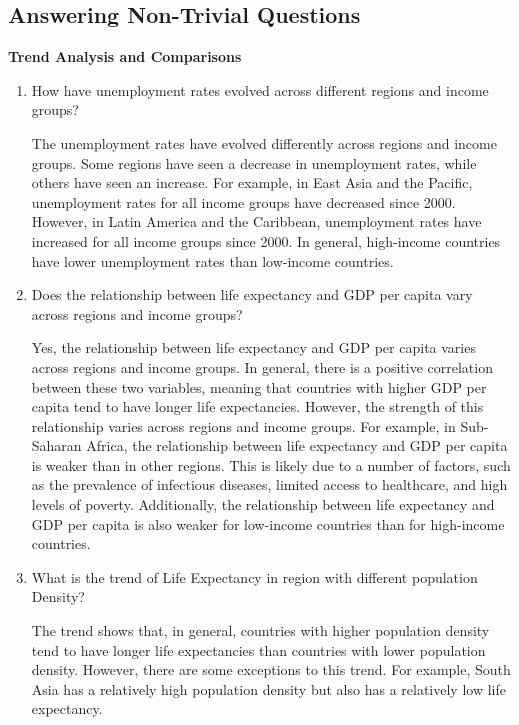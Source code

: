 \documentclass{article}\usepackage[]{graphicx}\usepackage[]{xcolor}
\begin{document}
\subsection{Answering Non-Trivial Questions}
\textbf{Trend Analysis and Comparisons}

\begin{enumerate}
    \item How have unemployment rates evolved across different regions and income groups?

    The unemployment rates have evolved differently across regions and income groups. Some regions have seen a decrease in unemployment rates, while others have seen an increase. For example, in East Asia and the Pacific, unemployment rates for all income groups have decreased since 2000. However, in Latin America and the Caribbean, unemployment rates have increased for all income groups since 2000. In general, high-income countries have lower unemployment rates than low-income countries.
    
    \item Does the relationship between life expectancy and GDP per capita vary across regions and income groups?
    
    Yes, the relationship between life expectancy and GDP per capita varies across regions and income groups. In general, there is a positive correlation between these two variables, meaning that countries with higher GDP per capita tend to have longer life expectancies. However, the strength of this relationship varies across regions and income groups. For example, in Sub-Saharan Africa, the relationship between life expectancy and GDP per capita is weaker than in other regions. This is likely due to a number of factors, such as the prevalence of infectious diseases, limited access to healthcare, and high levels of poverty. Additionally, the relationship between life expectancy and GDP per capita is also weaker for low-income countries than for high-income countries. 
    
    \item{What is the trend of Life Expectancy in region with different population Density?}
   
    The trend shows that, in general, countries with higher population density tend to have longer life expectancies than countries with lower population density. However, there are some exceptions to this trend. For example, South Asia  has a relatively high population density but also has a relatively low life expectancy. 
    

\end{enumerate}
\end{document}
